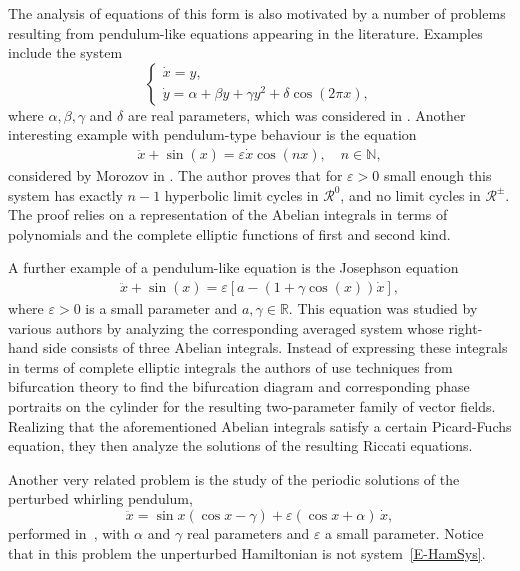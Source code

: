 \documentclass[12pt,psamsfonts]{amsart}
\begin{document}
The analysis of equations of this form  is also motivated by a
number of problems resulting from pendulum-like equations appearing
in the literature. Examples include  the system
\begin{equation*}
    {
  \left\{\!
   \begin{array}{l}
    \dot x={ y,} \\[2pt] \dot y={\alpha+\beta y+\gamma y^2+\delta\cos(2\pi x),}
   \end{array}
  \right.
}
\end{equation*}
where  $\alpha, \beta, \gamma$ and $\delta$  are real parameters,
which was considered in \cite{CheGasLli87}. Another interesting
example with  pendulum-type behaviour  is the equation
\begin{align*}
    \ddot x+\sin( x ) = {\varepsilon} \dot x \cos (nx),\quad n\in {\mathbb{N}},
\end{align*}
considered by Morozov in \cite{Morozov1989}. The author proves that for ${\varepsilon}>0$ small enough this
system has exactly  $n-1$ hyperbolic limit cycles in $\mathcal{R}^0$, and no limit cycles in
$\mathcal{R}^\pm.$
The proof relies on a representation of the Abelian integrals in
terms of polynomials and the complete elliptic functions of first and second kind.

 A further example of a pendulum-like equation is  the Josephson equation
\begin{align*}
    \ddot x + \sin(x)=\varepsilon[a-\left(1+\gamma\cos(x)\right)\dot x],
\end{align*}
where ${\varepsilon}>0$ is a small parameter and $a,\gamma\in{\mathbb{R}}$. This equation  was studied by various
authors \cite{Bel77a,Ken,Sanders1983,Sanders1986} by analyzing the corresponding averaged system
whose right-hand side consists of three Abelian integrals. Instead of  expressing
these integrals in terms of complete elliptic integrals the authors of \cite{Sanders1986} use
techniques from bifurcation theory to find the bifurcation diagram and corresponding phase
portraits on the cylinder for the resulting two-parameter family of vector fields. Realizing  that
the aforementioned  Abelian integrals satisfy a certain Picard-Fuchs equation, they then analyze
the solutions of the resulting Riccati equations.

Another very related problem is the study of the periodic solutions of the perturbed  whirling
pendulum,
\[
\ddot x= \sin x (\cos x-\gamma)+{\varepsilon} (\cos x+\alpha)\,\dot x,
\]
performed in~\cite{L1}, with $\alpha$ and $\gamma$ real parameters and ${\varepsilon}$ a small parameter.
Notice that in this problem the unperturbed Hamiltonian is not system~\eqref{E-HamSys}.
\\
\end{document}
